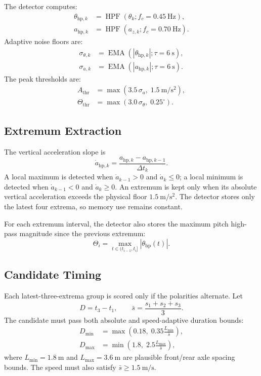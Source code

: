 \documentclass[11pt]{article}
\newcommand{\dt}{\Delta t}
\newcommand{\abs}[1]{\left|#1\right|}
\begin{document}
The detector computes:
\begin{align}
  \theta_{\mathrm{hp},k} &= \operatorname{HPF}(\theta_k; f_c=0.45~\mathrm{Hz}),\\
  a_{\mathrm{hp},k} &= \operatorname{HPF}(a_{z,k}; f_c=0.70~\mathrm{Hz}).
\end{align}
Adaptive noise floors are:
\begin{align}
  \sigma_{\theta,k} &= \operatorname{EMA}(\abs{\theta_{\mathrm{hp},k}};\tau=6~\mathrm{s}),\\
  \sigma_{a,k} &= \operatorname{EMA}(\abs{a_{\mathrm{hp},k}};\tau=6~\mathrm{s}).
\end{align}
The peak thresholds are:
\begin{align}
  A_{\mathrm{thr}} &= \max(3.5\,\sigma_a,\;1.5~\mathrm{m/s^2}),\\
  \Theta_{\mathrm{thr}} &= \max(3.0\,\sigma_\theta,\;0.25^\circ).
\end{align}

\subsection{Extremum Extraction}

The vertical acceleration slope is
\begin{equation}
  \dot{a}_{\mathrm{hp},k}
  = \frac{a_{\mathrm{hp},k}-a_{\mathrm{hp},k-1}}{\dt_k}.
\end{equation}
A local maximum is detected when \(\dot{a}_{k-1}>0\) and \(\dot{a}_{k}\le 0\);
a local minimum is detected when \(\dot{a}_{k-1}<0\) and \(\dot{a}_{k}\ge 0\).
An extremum is kept only when its absolute vertical acceleration exceeds the
physical floor \(1.5~\mathrm{m/s^2}\). The detector stores only the latest four
extrema, so memory use remains constant.

For each extremum interval, the detector also stores the maximum pitch
high-pass magnitude since the previous extremum:
\begin{equation}
  \Theta_i = \max_{t\in(t_{i-1},t_i]}\abs{\theta_{\mathrm{hp}}(t)}.
\end{equation}

\subsection{Candidate Timing}

Each latest-three-extrema group is scored only if the polarities alternate. Let
\begin{equation}
  D = t_3-t_1,\qquad
  \bar{s}=\frac{s_1+s_2+s_3}{3}.
\end{equation}
The candidate must pass both absolute and speed-adaptive duration bounds:
\begin{align}
  D_{\min} &=
  \max\left(0.18,\;0.35\frac{L_{\min}}{\bar{s}}\right),\\
  D_{\max} &=
  \min\left(1.8,\;2.5\frac{L_{\max}}{\bar{s}}\right),
\end{align}
where \(L_{\min}=1.8~\mathrm{m}\) and \(L_{\max}=3.6~\mathrm{m}\) are plausible
front/rear axle spacing bounds. The speed must also satisfy
\(\bar{s}\ge1.5~\mathrm{m/s}\).
\end{document}

